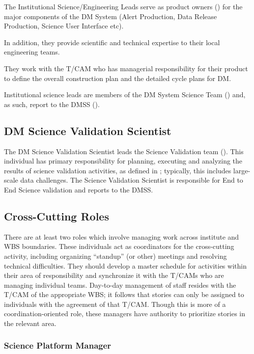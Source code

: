 The Institutional Science/Engineering Leads serve as product owners () for the major components of the \gls{DM} System (\gls{Alert Production}, Data \gls{Release} Production, Science User Interface etc).

In addition, they provide scientific and technical expertise to their local engineering teams.

They work with the \gls{T/CAM} who has managerial responsibility for their product to define the overall construction plan and the detailed cycle plans for \gls{DM}.

Institutional science leads are members of the \gls{DM} System Science Team () and, as such, report to the \gls{DMSS} ().

\subsection{DM Science \gls{Validation} Scientist}
\label{role:dmsvs}

The \gls{DM} Science \gls{Validation} Scientist leads the Science \gls{Validation} team ().
This individual has primary responsibility for planning, executing and analyzing the results of science validation activities, as defined in ; typically, this includes large-scale data challenges.
The Science \gls{Validation} Scientist is responsible for End to End Science validation and reports to the \gls{DMSS}.

\subsection{Cross-Cutting Roles}\label{role:crosscut}

There are at least two roles which involve managing work across institute and \gls{WBS} boundaries.
These individuals act as coordinators for the cross-cutting activity, including organizing ``standup'' (or other) meetings and resolving technical difficulties.
They should develop a master schedule for activities within their area of responsibility and synchronize it with the T/CAMs who are managing individual teams.
Day-to-day management of staff resides with the \gls{T/CAM} of the appropriate \gls{WBS}; it follows that stories can only be assigned to individuals with the agreement of that \gls{T/CAM}.
Though this is more of a coordination-oriented role, these managers have authority to prioritize stories in the relevant area.

\subsubsection{Science Platform Manager}\label{role:lsplead}

